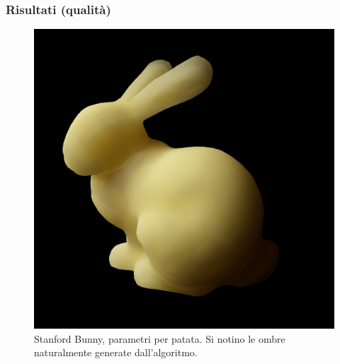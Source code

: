 \documentclass{beamer}
\begin{document}
\begin{frame}
    \frametitle{Risultati (qualità)}
\begin{figure}
\vspace{0.3cm}
\centering
\includegraphics[width=0.55 \textwidth]{bunny}
\vspace{-0.3cm}
\caption{Stanford Bunny, parametri per patata. Si notino le ombre naturalmente generate dall'algoritmo.}
\end{figure}
\end{frame}
\end{document}
